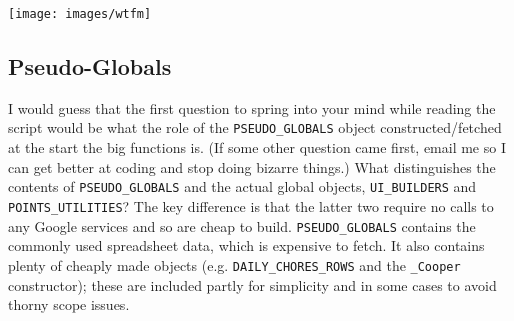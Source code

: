 \documentclass{article}
\begin{document}
\begin{center}
\texttt{[image: images/wtfm]}
\end{center}

\subsection{Pseudo-Globals}\label{subsec:pseudoGlobals}
I would guess that the first question to spring into your mind while reading the script would be what the role of the \texttt{PSEUDO\_GLOBALS} object constructed/fetched at the start the big functions is.
(If some other question came first, email me so I can get better at coding and stop doing bizarre things.)
What distinguishes the contents of \texttt{PSEUDO\_GLOBALS} and the actual global objects, \texttt{UI\_BUILDERS} and \texttt{POINTS\_UTILITIES}?
The key difference is that the latter two require no calls to any Google services and so are cheap to build.
\texttt{PSEUDO\_GLOBALS} contains the commonly used spreadsheet data, which is expensive to fetch.
It also contains plenty of cheaply made objects (e.g. \texttt{DAILY\_CHORES\_ROWS} and the \texttt{\_Cooper} constructor); these are included partly for simplicity and in some cases to avoid thorny scope issues.
\end{document}
